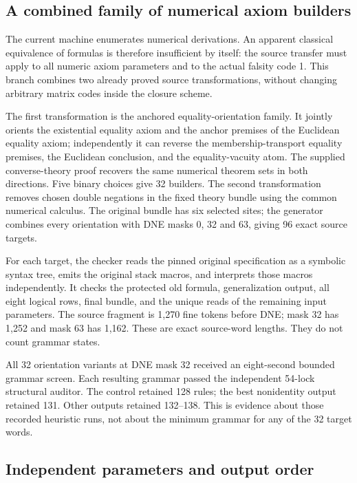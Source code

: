 \subsection{A combined family of numerical axiom builders}

The current machine enumerates numerical derivations. An apparent
classical equivalence of formulas is therefore insufficient by itself:
the source transfer must apply to all numeric axiom parameters and to the
actual falsity code 1. This branch combines two already proved source
transformations, without changing arbitrary matrix codes inside the
closure scheme.

The first transformation is the anchored equality-orientation family.
It jointly orients the existential equality axiom and the anchor
premises of the Euclidean equality axiom; independently it can reverse
the membership-transport equality premises, the Euclidean conclusion,
and the equality-vacuity atom. The supplied converse-theory proof
recovers the same numerical theorem sets in both directions. Five
binary choices give 32 builders. The second transformation removes
chosen double negations in the fixed theory bundle using the common
numerical calculus. The original bundle has six selected sites; the
generator combines every orientation with DNE masks 0, 32 and 63,
giving 96 exact source targets.

For each target, the checker reads the pinned original specification as
a symbolic syntax tree, emits the original stack macros, and interprets
those macros independently. It checks the protected old formula,
generalization output, all eight logical rows, final bundle, and the
unique reads of the remaining input parameters. The source fragment is
1,270 fine tokens before DNE; mask 32 has 1,252 and mask 63 has 1,162.
These are exact source-word lengths. They do not count grammar states.

All 32 orientation variants at DNE mask 32 received an eight-second
bounded grammar screen. Each resulting grammar passed the independent
54-lock structural auditor. The control retained 128 rules; the best
nonidentity output retained 131. Other outputs retained 132--138.
This is evidence about those recorded heuristic runs, not about the
minimum grammar for any of the 32 target words.

\subsection{Independent parameters and output order}


